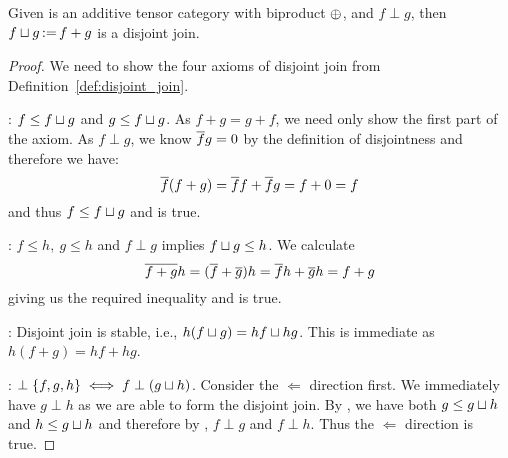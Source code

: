 \begin{proposition}\label{prop:biproduct_is_the_disjoint_join_in_cfrobx}
  Given \X is an  additive tensor category with biproduct $\oplus$, and $f\perp g$, then $f\sqcup g
  \operatorname*{:\!=} f+g$ is a disjoint join.
\end{proposition}
\begin{proof}
  We need to show the four axioms of disjoint join from Definition~\ref{def:disjoint_join}.

   : $f \le f \sqcup g$ and $g \le f \sqcup g$.
  As $f+g = g+f$, we need only show the first part of the axiom. As $f\perp g$, we know $\overline{f}g=0$
  by the definition of disjointness and therefore we have:
  \[
    \overline{f}(f+g) = \overline{f}f + \overline{f} g = f + 0 = f
  \]
  and thus $f \le f \sqcup g$ and  is true.

  : $f \le h,\ g \le h$ and $f\perp g$ implies $f \sqcup g \le h$.  We calculate
  \[
    \overline{f+g}h = (\overline{f}+\overline{g}) h = \overline{f}h + \overline{g} h = f + g
  \]
  giving us the required inequality and  is true.

  : Disjoint join is stable, i.e., $h(f \sqcup g) = h f \sqcup h g$. This is immediate
  as $h(f+g) = hf + h g$.

  : $\perp \{f, g, h\} \iff f \perp (g\sqcup h)$. Consider the $\Longleftarrow$
  direction first. We immediately have $g\perp h$ as we are able to form the disjoint join. By
  , we have both $g \le g \sqcup h$ and $h \le g\sqcup h$ and therefore by
  , $f \perp g$ and $f\perp h$. Thus the $\Longleftarrow$ direction is true.


\end{proof}
